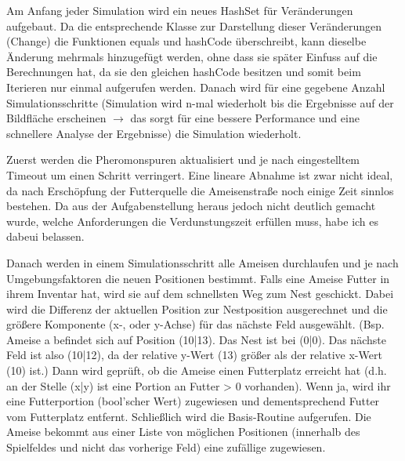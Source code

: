 \documentclass[a4paper,12pt]{scrartcl}
\begin{document}
Am Anfang jeder Simulation wird ein neues HashSet für Veränderungen aufgebaut. Da die entsprechende Klasse zur Darstellung dieser Veränderungen (Change) die Funktionen equals und hashCode überschreibt, kann dieselbe Änderung mehrmals hinzugefügt werden, ohne dass sie später Einfuss auf die Berechnungen hat, da sie den gleichen hashCode besitzen und somit beim Iterieren nur einmal aufgerufen werden. Danach wird für eine gegebene Anzahl Simulationsschritte (Simulation wird n-mal wiederholt bis die Ergebnisse auf der Bildfläche erscheinen $\rightarrow$ das sorgt für eine bessere Performance und eine schnellere Analyse der Ergebnisse) die Simulation wiederholt.

Zuerst werden die Pheromonspuren aktualisiert und je nach eingestelltem Timeout um einen Schritt verringert. Eine lineare Abnahme ist zwar nicht ideal, da nach Erschöpfung der Futterquelle die Ameisenstraße noch einige Zeit \glqq{}sinnlos\grqq{} bestehen. Da aus der Aufgabenstellung heraus jedoch nicht deutlich gemacht wurde, welche Anforderungen die Verdunstungszeit erfüllen muss, habe ich es dabeui belassen.

Danach werden in einem Simulationsschritt alle Ameisen durchlaufen und je nach \glqq{}Umgebungsfaktoren\grqq{} die neuen Positionen bestimmt. Falls eine Ameise Futter in ihrem Inventar hat, wird sie auf dem schnellsten Weg zum Nest geschickt. Dabei wird die Differenz der aktuellen Position zur Nestposition ausgerechnet und die größere Komponente (x-, oder y-Achse) für das nächste Feld ausgewählt. (Bsp. Ameise a befindet sich auf Position (10|13). Das Nest ist bei (0|0). Das nächste Feld ist also (10|12), da der relative y-Wert (13) größer als der relative x-Wert (10) ist.)
Dann wird geprüft, ob die Ameise einen Futterplatz erreicht hat (d.h. an der Stelle (x|y) ist eine Portion an Futter > 0 vorhanden). Wenn ja, wird ihr eine Futterportion (bool'scher Wert) zugewiesen und dementsprechend Futter vom Futterplatz entfernt.
Schließlich wird die Basis-Routine aufgerufen. Die Ameise bekommt aus einer Liste von möglichen Positionen (innerhalb des Spielfeldes und nicht das vorherige Feld) eine zufällige zugewiesen.
\end{document}
